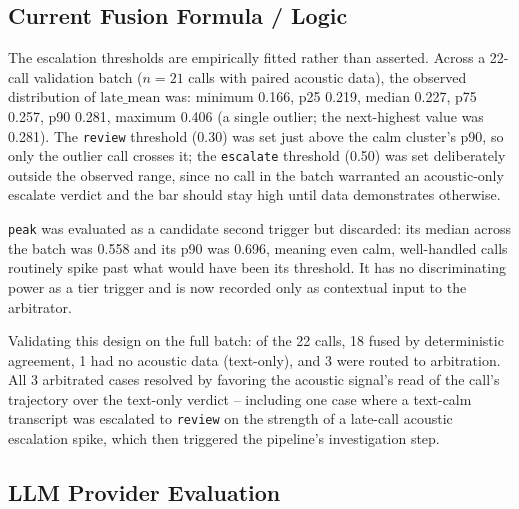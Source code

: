 \subsection{Current Fusion Formula / Logic}
\label{subsec:formula}

The escalation thresholds are empirically fitted rather than asserted.
Across a 22-call validation batch ($n=21$ calls with paired acoustic
data), the observed distribution of $\text{late\_mean}$ was: minimum
0.166, p25 0.219, median 0.227, p75 0.257, p90 0.281, maximum 0.406 (a
single outlier; the next-highest value was 0.281). The \texttt{review}
threshold (0.30) was set just above the calm cluster's p90, so only the
outlier call crosses it; the \texttt{escalate} threshold (0.50) was set
deliberately outside the observed range, since no call in the batch
warranted an acoustic-only escalate verdict and the bar should stay high
until data demonstrates otherwise.

\texttt{peak} was evaluated as a candidate second trigger but discarded:
its median across the batch was 0.558 and its p90 was 0.696, meaning
even calm, well-handled calls routinely spike past what would have been
its threshold. It has no discriminating power as a tier trigger and is
now recorded only as contextual input to the arbitrator.

Validating this design on the full batch: of the 22 calls, 18 fused by
deterministic agreement, 1 had no acoustic data (text-only), and 3 were
routed to arbitration. All 3 arbitrated cases resolved by favoring the
acoustic signal's read of the call's trajectory over the text-only
verdict -- including one case where a text-calm transcript was escalated
to \texttt{review} on the strength of a late-call acoustic escalation
spike, which then triggered the pipeline's investigation step.

\subsection{LLM Provider Evaluation}

